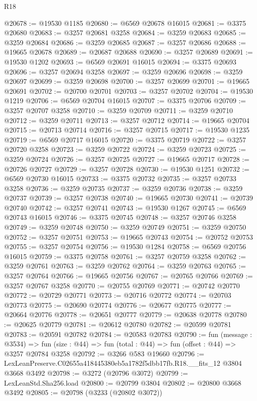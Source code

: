 \begin{lexlean}{R18}
\begin{coremodule}
@20678 := @19530 @1185
@20680 := @6569 @20678 @16015
@20681 := @3375 @20680
@20683 := @3257 @20681 @3258
@20684 := @3259 @20683
@20685 := @3259 @20684
@20686 := @3259 @20685
@20687 := @3257 @20686
@20688 := @19665 @20678
@20689 := @20687 @20688
@20690 := @3257 @20689
@20691 := @19530 @1202
@20693 := @6569 @20691 @16015
@20694 := @3375 @20693
@20696 := @3257 @20694 @3258
@20697 := @3259 @20696
@20698 := @3259 @20697
@20699 := @3259 @20698
@20700 := @3257 @20699
@20701 := @19665 @20691
@20702 := @20700 @20701
@20703 := @3257 @20702
@20704 := @19530 @1219
@20706 := @6569 @20704 @16015
@20707 := @3375 @20706
@20709 := @3257 @20707 @3258
@20710 := @3259 @20709
@20711 := @3259 @20710
@20712 := @3259 @20711
@20713 := @3257 @20712
@20714 := @19665 @20704
@20715 := @20713 @20714
@20716 := @3257 @20715
@20717 := @19530 @1235
@20719 := @6569 @20717 @16015
@20720 := @3375 @20719
@20722 := @3257 @20720 @3258
@20723 := @3259 @20722
@20724 := @3259 @20723
@20725 := @3259 @20724
@20726 := @3257 @20725
@20727 := @19665 @20717
@20728 := @20726 @20727
@20729 := @3257 @20728
@20730 := @19530 @1251
@20732 := @6569 @20730 @16015
@20733 := @3375 @20732
@20735 := @3257 @20733 @3258
@20736 := @3259 @20735
@20737 := @3259 @20736
@20738 := @3259 @20737
@20739 := @3257 @20738
@20740 := @19665 @20730
@20741 := @20739 @20740
@20742 := @3257 @20741
@20743 := @19530 @1267
@20745 := @6569 @20743 @16015
@20746 := @3375 @20745
@20748 := @3257 @20746 @3258
@20749 := @3259 @20748
@20750 := @3259 @20749
@20751 := @3259 @20750
@20752 := @3257 @20751
@20753 := @19665 @20743
@20754 := @20752 @20753
@20755 := @3257 @20754
@20756 := @19530 @1284
@20758 := @6569 @20756 @16015
@20759 := @3375 @20758
@20761 := @3257 @20759 @3258
@20762 := @3259 @20761
@20763 := @3259 @20762
@20764 := @3259 @20763
@20765 := @3257 @20764
@20766 := @19665 @20756
@20767 := @20765 @20766
@20769 := @3257 @20767 @3258
@20770 := @20755 @20769
@20771 := @20742 @20770
@20772 := @20729 @20771
@20773 := @20716 @20772
@20774 := @20703 @20773
@20775 := @20690 @20774
@20776 := @20677 @20775
@20777 := @20664 @20776
@20778 := @20651 @20777
@20779 := @20638 @20778
@20780 := @20625 @20779
@20781 := @20612 @20780
@20782 := @20599 @20781
@20783 := @20591 @20782
@20784 := @20583 @20783
@20790 := fun (message : @3534) =>
  fun (size : @44) => fun (total : @44) => fun (offset : @44) => @3257 @20784 @3258
@20792 := @3266 @583 @19660
@20796 := LexLeanPreserve.C02655a418445380eb5a1782f5dbb17fb.R18.__fits_12 @3804 @3668 @3492
@20798 := @3272 (@20796 @3072)
@20799 := LexLeanStd.Sha256.load
@20800 := @20799 @3804
@20802 := @20800 @3668 @3492
@20805 := @20798 (@3233 (@20802 @3072))

\end{coremodule}
\end{lexlean}
